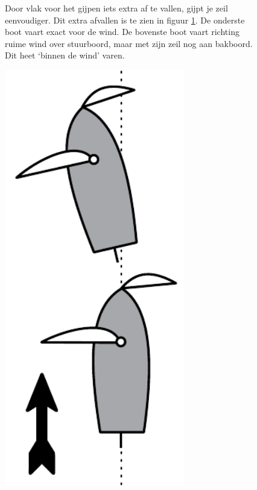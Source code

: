 \begin{figure}[H]
\begin{minipage}[t]{0.78\textwidth}
		
		Door vlak voor het gijpen iets extra af te vallen, gijpt je zeil eenvoudiger. Dit extra afvallen is te zien in figuur \ref{pic:binnen_wind}. De onderste boot vaart exact voor de wind. De bovenste boot vaart richting ruime wind over stuurboord, maar met zijn zeil nog aan bakboord. Dit heet `binnen de wind' varen.
	\end{minipage}
	\hfill
	\begin{minipage}[b]{0.18\textwidth}
		\centering
		\includegraphics[width=0.7\textwidth]{Hoofdstukken/Onderdelen/pdf/binnen_de_wind.pdf}
		\caption{}
		\label{pic:binnen_wind}
	\end{minipage}
\end{figure}


